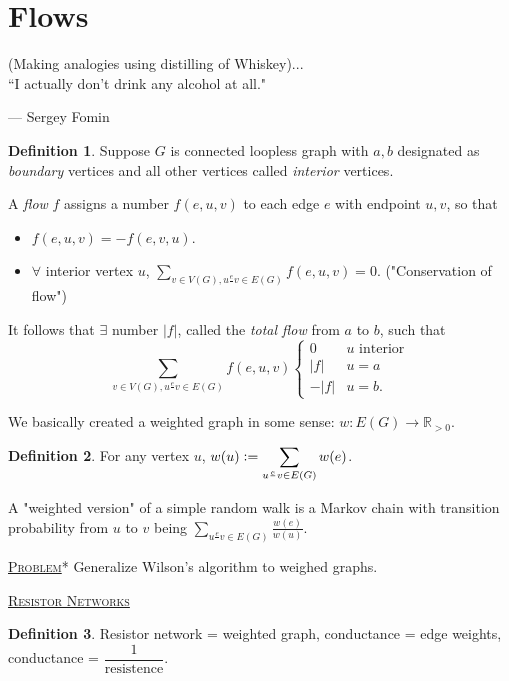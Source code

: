 \documentclass{report}
\newcommand{\R}{\mathbb{R}}
\newcommand{\defeq}{\vcentcolon=}
\newcommand{\fancyem}[1]{\underline{\textsc{#1}}}
\theoremstyle{definition}
\newtheorem{definition}{Definition}[section]
\theoremstyle{remark}
\numberwithin{equation}{section}
\begin{document}
\section{Flows}
\epigraph{(Making analogies using distilling of Whiskey)...\\``I actually don't drink any alcohol at all."}{--- \textup{Sergey Fomin}}
\begin{definition}
    Suppose $G$ is connected loopless graph with $a, b$ designated as \emph{boundary} vertices and all other vertices called \emph{interior} vertices. 
    
    A \emph{flow} $f$ assigns a number $f(e, u, v)$ to each edge $e$ with endpoint $u, v$, so that \begin{itemize}
        \item $f(e, u, v) = -f(e, v, u)$.
        \item $\forall$ interior vertex $u$, $\displaystyle \sum_{v \in V(G), u\frac{e}{}v  \in E(G)} f(e, u, v) = 0$. ("Conservation of flow")
    \end{itemize}
\end{definition}
It follows that $\exists$ number $|f|$, called the \emph{total flow} from $a$ to $b$, such that \begin{equation}\label{eq:1stkirchhoff}
\sum_{v \in V(G), u\frac{e}{}v \in E(G)} f(e, u, v)\begin{cases}
    0 & u \text{ interior} \\
    |f| &  u = a \\
    -|f| & u = b.
\end{cases}    
\end{equation}

We basically created a weighted graph in some sense: $w: E(G) \to \R_{>0}$. 
\begin{definition}
    For any vertex $u$, $\displaystyle w(u) \defeq \sum_{u\frac{e}{}v  \in E(G)} w(e)$.
\end{definition}

A "weighted version" of a simple random walk is a Markov chain with transition probability from $u$ to $v$ being $\displaystyle \sum_{u\frac{e}{}v \in E(G)} \frac{w(e)}{w(u)}$.

\fancyem{Problem}* Generalize Wilson's algorithm to weighed graphs.

\fancyem{Resistor Networks}
\begin{definition}
    Resistor network = weighted graph, conductance = edge weights, conductance = $\dfrac{1}{\text{resistence}}$.
\end{definition}
\end{document}
